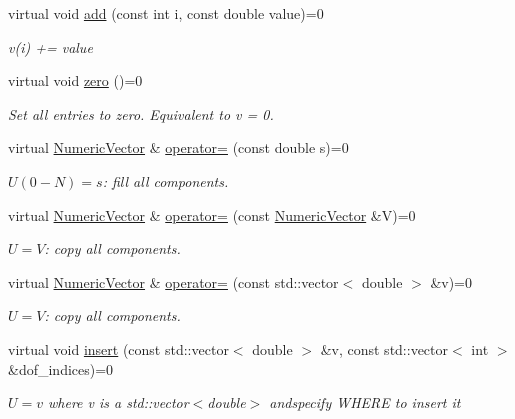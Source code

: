 \begin{DoxyCompactItemize}
virtual void \mbox{\hyperlink{classfemus_1_1_numeric_vector_a016609e0912f741ed161b201edf8f86f}{add}} (const int i, const double value)=0
\begin{DoxyCompactList}\small\item\em v(i) += value \end{DoxyCompactList}\item 
virtual void \mbox{\hyperlink{classfemus_1_1_numeric_vector_a80b1efdc7101659f2035c2da880360e7}{zero}} ()=0
\begin{DoxyCompactList}\small\item\em Set all entries to zero. Equivalent to {\ttfamily v} = 0. \end{DoxyCompactList}\item 
virtual \mbox{\hyperlink{classfemus_1_1_numeric_vector}{Numeric\+Vector}} \& \mbox{\hyperlink{classfemus_1_1_numeric_vector_a1c9d027a5cae16fac71c211e7c894d64}{operator=}} (const double s)=0
\begin{DoxyCompactList}\small\item\em $U(0-N) = s$\+: fill all components. \end{DoxyCompactList}\item 
virtual \mbox{\hyperlink{classfemus_1_1_numeric_vector}{Numeric\+Vector}} \& \mbox{\hyperlink{classfemus_1_1_numeric_vector_aee703747a54ccc1b4404f860e6aad8f2}{operator=}} (const \mbox{\hyperlink{classfemus_1_1_numeric_vector}{Numeric\+Vector}} \&V)=0
\begin{DoxyCompactList}\small\item\em $U = V$\+: copy all components. \end{DoxyCompactList}\item 
virtual \mbox{\hyperlink{classfemus_1_1_numeric_vector}{Numeric\+Vector}} \& \mbox{\hyperlink{classfemus_1_1_numeric_vector_abc0599ee26efae2c2d8b90d0464e652b}{operator=}} (const std\+::vector$<$ double $>$ \&v)=0
\begin{DoxyCompactList}\small\item\em $U = V$\+: copy all components. \end{DoxyCompactList}\item 
virtual void \mbox{\hyperlink{classfemus_1_1_numeric_vector_a96f696c38f27d57cf58bfb0fac9d9f6f}{insert}} (const std\+::vector$<$ double $>$ \&v, const std\+::vector$<$ int $>$ \&dof\+\_\+indices)=0
\begin{DoxyCompactList}\small\item\em $ U=v $ where v is a std\+::vector$<$double$>$ andspecify W\+H\+E\+RE to insert it \end{DoxyCompactList}\item 

\end{DoxyCompactItemize}
